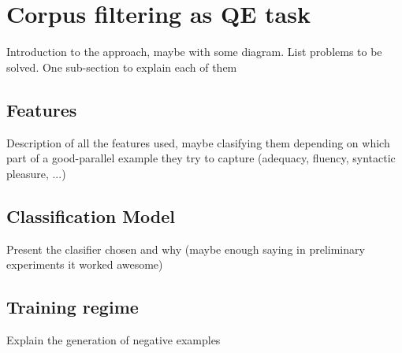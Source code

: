 \section{Corpus filtering as QE task}

Introduction to the approach, maybe with some diagram. List problems to be solved. One sub-section to explain each of them

\subsection{Features}
Description of all the features used, maybe clasifying them depending on which part of a good-parallel example they try to capture (adequacy, fluency, syntactic pleasure, ...)

\subsection{Classification Model}
Present the clasifier chosen and why (maybe enough saying in preliminary experiments it worked awesome)

\subsection{Training regime}
Explain the generation of negative examples
